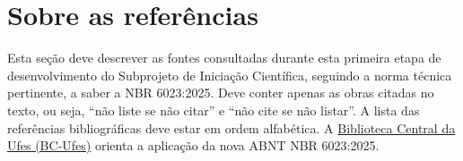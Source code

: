 \documentclass[a4paper,12pt]{article}
\begin{document}
\section*{Sobre as referências}
Esta seção deve descrever as fontes consultadas durante esta primeira etapa de desenvolvimento do Subprojeto de Iniciação Científica, seguindo a norma técnica pertinente, a saber a NBR 6023:2025. Deve conter apenas as obras citadas no texto, ou seja, “não liste se não citar” e “não cite se não listar”. A lista das referências bibliográficas deve estar em ordem alfabética. A \href{https://biblioteca.ufes.br/normalizacao}{Biblioteca Central da Ufes (BC-Ufes)} orienta a aplicação da nova ABNT NBR 6023:2025.



%
\end{document}
